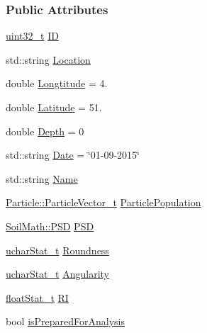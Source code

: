 \subsubsection*{Public Attributes}
\begin{DoxyCompactItemize}
\item 
\hyperlink{_soil_math_types_8h_a435d1572bf3f880d55459d9805097f62}{uint32\+\_\+t} \hyperlink{class_soil_analyzer_1_1_sample_a5eab03e759ae5754000ad10c30e75d15}{I\+D}
\item 
std\+::string \hyperlink{class_soil_analyzer_1_1_sample_afa863082d9931f8b5a7ab2429446c132}{Location}
\item 
double \hyperlink{class_soil_analyzer_1_1_sample_a7fc9f7ac8ea1f8fa87450bea41c33683}{Longtitude} = 4.
\item 
double \hyperlink{class_soil_analyzer_1_1_sample_aab622a2839ed86ab87f85ad2d1359ff8}{Latitude} = 51.
\item 
double \hyperlink{class_soil_analyzer_1_1_sample_a61d5788ae61e9fd62f8bff35bd0bc068}{Depth} = 0
\item 
std\+::string \hyperlink{class_soil_analyzer_1_1_sample_a9d97841637bbbba5b50b62d51b1b1b81}{Date} = \char`\"{}01-\/09-\/2015\char`\"{}
\item 
std\+::string \hyperlink{class_soil_analyzer_1_1_sample_a94a2895e7885f5195ef7d050f37ee233}{Name}
\item 
\hyperlink{class_soil_analyzer_1_1_particle_a4e43dab999d36d5a5f809bb4be5ff3a7}{Particle\+::\+Particle\+Vector\+\_\+t} \hyperlink{class_soil_analyzer_1_1_sample_a877bf12069fe09d2c8f9636f19ed5335}{Particle\+Population}
\item 
\hyperlink{class_soil_math_1_1_p_s_d}{Soil\+Math\+::\+P\+S\+D} \hyperlink{class_soil_analyzer_1_1_sample_a3a2cd7007e7867a6b3fb346f51b2ba60}{P\+S\+D}
\item 
\hyperlink{_stats_8h_a5b876b087ada3df30b8dd6309fc25191}{uchar\+Stat\+\_\+t} \hyperlink{class_soil_analyzer_1_1_sample_a36b7e98ebd5d162fa0cda77fa4c7f0be}{Roundness}
\item 
\hyperlink{_stats_8h_a5b876b087ada3df30b8dd6309fc25191}{uchar\+Stat\+\_\+t} \hyperlink{class_soil_analyzer_1_1_sample_aac706ea1206fea6b708227c88481081d}{Angularity}
\item 
\hyperlink{_stats_8h_a5f9676504b14f796e82c229b4dddc50b}{float\+Stat\+\_\+t} \hyperlink{class_soil_analyzer_1_1_sample_aa3530cc6d609fb9bdd4817d105f62d01}{R\+I}
\item 
bool \hyperlink{class_soil_analyzer_1_1_sample_a0bbd1340cc91d63420ecd9fb4c9dac83}{is\+Prepared\+For\+Analysis}

\end{DoxyCompactItemize}
